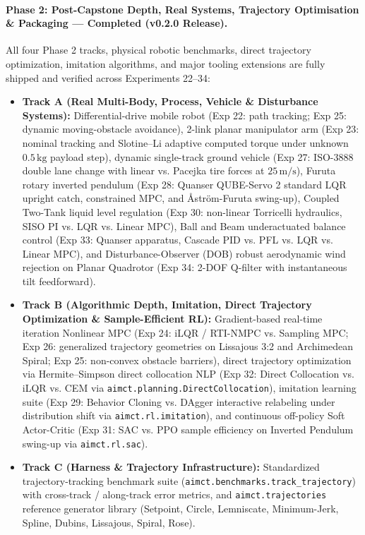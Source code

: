 \documentclass[11pt,a4paper]{article}
\begin{document}
\paragraph{Phase 2: Post-Capstone Depth, Real Systems, Trajectory Optimisation \& Packaging --- Completed (v0.2.0 Release).}
All four Phase 2 tracks, physical robotic benchmarks, direct trajectory optimization, imitation algorithms, and major tooling extensions are fully shipped and verified across Experiments 22--34:
\begin{itemize}[nosep]
  \item \textbf{Track A (Real Multi-Body, Process, Vehicle \& Disturbance Systems):} Differential-drive mobile robot (Exp 22: path tracking; Exp 25: dynamic moving-obstacle avoidance), 2-link planar manipulator arm (Exp 23: nominal tracking and Slotine--Li adaptive computed torque under unknown $0.5\,\text{kg}$ payload step), dynamic single-track ground vehicle (Exp 27: ISO-3888 double lane change with linear vs. Pacejka tire forces at $25\,\text{m/s}$), Furuta rotary inverted pendulum (Exp 28: Quanser QUBE-Servo 2 standard LQR upright catch, constrained MPC, and Åström-Furuta swing-up), Coupled Two-Tank liquid level regulation (Exp 30: non-linear Torricelli hydraulics, SISO PI vs. LQR vs. Linear MPC), Ball and Beam underactuated balance control (Exp 33: Quanser apparatus, Cascade PID vs. PFL vs. LQR vs. Linear MPC), and Disturbance-Observer (DOB) robust aerodynamic wind rejection on Planar Quadrotor (Exp 34: 2-DOF Q-filter with instantaneous tilt feedforward).
  \item \textbf{Track B (Algorithmic Depth, Imitation, Direct Trajectory Optimization \& Sample-Efficient RL):} Gradient-based real-time iteration Nonlinear MPC (Exp 24: iLQR / RTI-NMPC vs. Sampling MPC; Exp 26: generalized trajectory geometries on Lissajous 3:2 and Archimedean Spiral; Exp 25: non-convex obstacle barriers), direct trajectory optimization via Hermite--Simpson direct collocation NLP (Exp 32: Direct Collocation vs. iLQR vs. CEM via \texttt{aimct.planning.DirectCollocation}), imitation learning suite (Exp 29: Behavior Cloning vs. DAgger interactive relabeling under distribution shift via \texttt{aimct.rl.imitation}), and continuous off-policy Soft Actor-Critic (Exp 31: SAC vs. PPO sample efficiency on Inverted Pendulum swing-up via \texttt{aimct.rl.sac}).
  \item \textbf{Track C (Harness \& Trajectory Infrastructure):} Standardized trajectory-tracking benchmark suite (\texttt{aimct.benchmarks.track\_trajectory}) with cross-track / along-track error metrics, and \texttt{aimct.trajectories} reference generator library (Setpoint, Circle, Lemniscate, Minimum-Jerk, Spline, Dubins, Lissajous, Spiral, Rose).

\end{itemize}
\end{document}
